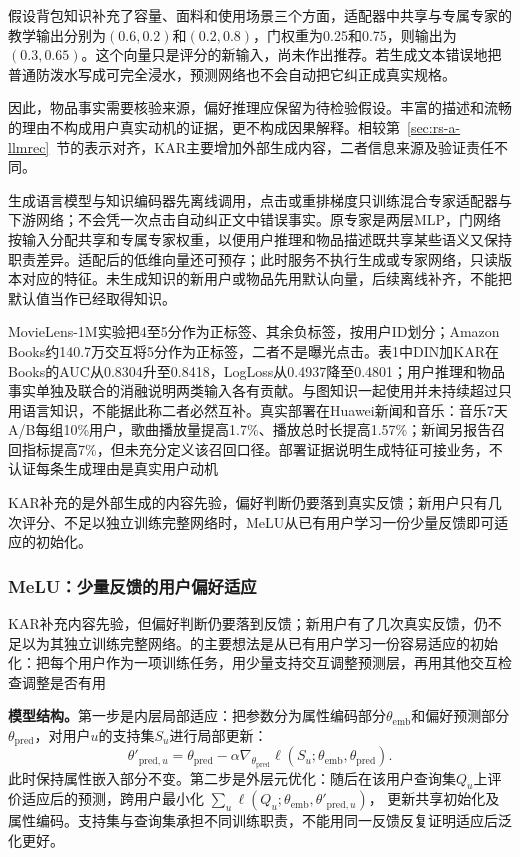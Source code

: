 假设背包知识补充了容量、面料和使用场景三个方面，适配器中共享与专属专家的教学输出分别为$(0.6,0.2)$和$(0.2,0.8)$，门权重为0.25和0.75，则输出为$(0.3,0.65)$。这个向量只是评分的新输入，尚未作出推荐。若生成文本错误地把普通防泼水写成可完全浸水，预测网络也不会自动把它纠正成真实规格。

因此，物品事实需要核验来源，偏好推理应保留为待检验假设。丰富的描述和流畅的理由不构成用户真实动机的证据，更不构成因果解释。相较第~\ref{sec:rs-a-llmrec}~节的表示对齐，KAR主要增加外部生成内容，二者信息来源及验证责任不同。

生成语言模型与知识编码器先离线调用，点击或重排梯度只训练混合专家适配器与下游网络；不会凭一次点击自动纠正文中错误事实。原专家是两层MLP，门网络按输入分配共享和专属专家权重，以便用户推理和物品描述既共享某些语义又保持职责差异。适配后的低维向量还可预存；此时服务不执行生成或专家网络，只读版本对应的特征。未生成知识的新用户或物品先用默认向量，后续离线补齐，不能把默认值当作已经取得知识。

MovieLens-1M实验把4至5分作为正标签、其余负标签，按用户ID划分；Amazon Books约140.7万交互将5分作为正标签，二者不是曝光点击。表1中DIN加KAR在Books的AUC从0.8304升至0.8418，LogLoss从0.4937降至0.4801；用户推理和物品事实单独及联合的消融说明两类输入各有贡献。与图知识一起使用并未持续超过只用语言知识，不能据此称二者必然互补。真实部署在Huawei新闻和音乐：音乐7天A/B每组10\%用户，歌曲播放量提高1.7\%、播放总时长提高1.57\%；新闻另报告召回指标提高7\%，但未充分定义该召回口径。部署证据说明生成特征可接业务，不认证每条生成理由是真实用户动机

KAR补充的是外部生成的内容先验，偏好判断仍要落到真实反馈；新用户只有几次评分、不足以独立训练完整网络时，MeLU从已有用户学习一份少量反馈即可适应的初始化。

\subsubsection{MeLU：少量反馈的用户偏好适应}
\label{sec:rs-melu}

KAR补充内容先验，但偏好判断仍要落到反馈；新用户有了几次真实反馈，仍不足以为其独立训练完整网络。的主要想法是从已有用户学习一份容易适应的初始化：把每个用户作为一项训练任务，用少量支持交互调整预测层，再用其他交互检查调整是否有用

\textbf{模型结构。}第一步是内层局部适应：把参数分为属性编码部分$\theta_{\mathrm{emb}}$和偏好预测部分$\theta_{\mathrm{pred}}$，对用户$u$的支持集$S_u$进行局部更新：
\begin{equation}
  \theta'_{\mathrm{pred},u}=
  \theta_{\mathrm{pred}}-\alpha\nabla_{\theta_{\mathrm{pred}}}
     \ell(S_u;\theta_{\mathrm{emb}},\theta_{\mathrm{pred}}).
  \label{eq:rs-melu-inner}
\end{equation}
此时保持属性嵌入部分不变。第二步是外层元优化：随后在该用户查询集$Q_u$上评价适应后的预测，跨用户最小化
$\sum_u\ell(Q_u;\theta_{\mathrm{emb}},\theta'_{\mathrm{pred},u})$，
更新共享初始化及属性编码。支持集与查询集承担不同训练职责，不能用同一反馈反复证明适应后泛化更好。


